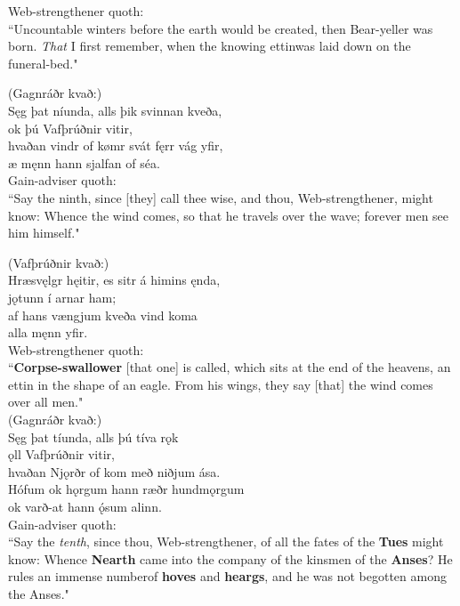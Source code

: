 \bvb Web-strengthener quoth: \\ “Uncountable winters before the earth would be created, then Bear-yeller was born. \emph{That} I first remember, when the knowing ettin\footnotemark[60] was laid down on the funeral-bed\footnotemark[61]." \\

(Gagnráðr kvað:) \\%
\bva Sęg þat níunda, \hld alls þik svinnan kveða, \\%
ok þú Vafþrúðnir vitir, \\%
hvaðan vindr of kømr \hld svát fęrr vág yfir, \\%
æ męnn hann sjalfan of séa.\\%

\bvb Gain-adviser quoth: \\ “Say the ninth, since [they] call thee wise, and thou, Web-strengthener, might know: Whence the wind comes, so that he travels over the wave; forever men see him himself.\footnotemark[65]" \\

(Vafþrúðnir kvað:) \\%
\bva Hræsvęlgr hęitir, \hld es sitr á himins ęnda, \\%
jǫtunn í arnar ham; \\%
af hans vængjum \hld kveða vind koma \\%
alla męnn yfir.\\%

\bvb Web-strengthener quoth: \\ “\textbf{Corpse-swallower} [that one] is called, which sits at the end of the heavens, an ettin in the shape of an eagle. From his wings, they say [that] the wind comes over all men." \\

(Gagnráðr kvað:) \\%
\bva Sęg þat tíunda, \hld alls þú tíva rǫk \\%
ǫll Vafþrúðnir vitir, \\%
hvaðan Njǫrðr of kom \hld með niðjum ása. \\%
Hófum ok hǫrgum \hld hann ræðr hundmǫrgum \\%
ok varð-at hann ǫ́sum alinn.\\%

\bvb Gain-adviser quoth: \\ “Say the \emph{tenth}, since thou, Web-strengthener, of all the fates of the \textbf{Tues} might know: Whence \textbf{Nearth} came into the company of the kinsmen of the \textbf{Anses}? He rules an immense number\footnotemark[68] of \textbf{hoves} and \textbf{heargs}, and he was not begotten among the Anses." \\

